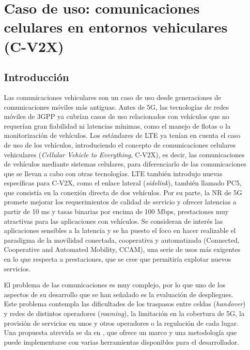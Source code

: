 \documentclass[12pt]{report} %
\begin{document}
%
%
%
%

\chapter{Caso de uso: comunicaciones celulares en entornos vehiculares (C-V2X)}

\section{Introducción}

Las comunicaciones vehiculares son un caso de uso desde generaciones de comunicaciones móviles más antiguas.
Antes de 5G, las tecnologías de redes móviles de 3GPP ya cubrían casos de uso relacionados con vehículos que no requerían gran fiabilidad ni latencias mínimas,
como el manejo de flotas o la monitorización de vehículos.
Los estándares de LTE ya tenían en cuenta el caso de uso de los vehículos, introduciendo el concepto de comunicaciones celulares vehiculares (\textit{Cellular Vehicle to Everything}, C-V2X),
es decir, las comunicaciones de vehículos mediante sistemas celulares, para diferenciarlo de las comunicaciones que se llevan a cabo con otras tecnologías.
LTE también introdujo nuevas específicas para C-V2X, como el enlace lateral (\textit{sidelink}), también llamado PC5,
que consistía en la conexión directa de dos vehículos.
Por su parte, la NR de 5G promete mejorar los requerimientos de calidad de servicio y ofrecer latencias a partir de 10 ms y tasas binarias por encima de 100 Mbps,
prestaciones muy atractivas para las aplicaciones con vehículos.
Se consideran de interés las aplicaciones sensibles a la latencia y se ha puesto el foco en hacer realizable el paradigma de la movilidad conectada, cooperativa y automatizada (Connected, Cooperative and Automated Mobility, CCAM),
una serie de usos más exigentes en lo que respecta a prestaciones, que se cree que permitiría explotar nuevos servicios.
\cite{RefWorks:25}

El problema de las comunicaciones es muy complejo, por lo que uno de los aspectos de su desarrollo que se han señalado es la evaluación de despliegues.
Este problema contempla las dificultades de los traspasos entre celdas (\textit{handover}) y redes de distintos operadores (\textit{roaming}),
la limitación en la cobertura de 5G,
la provisión de servicios en unos y otros operadores o la regulación de cada lugar.
\cite{RefWorks:25}
Una propuesta atrevida se da en \cite{RefWorks:25}, que ofrece un marco y una metodología que puede implementarse con varias herramientas disponibles para el desarrollador.
\end{document}
